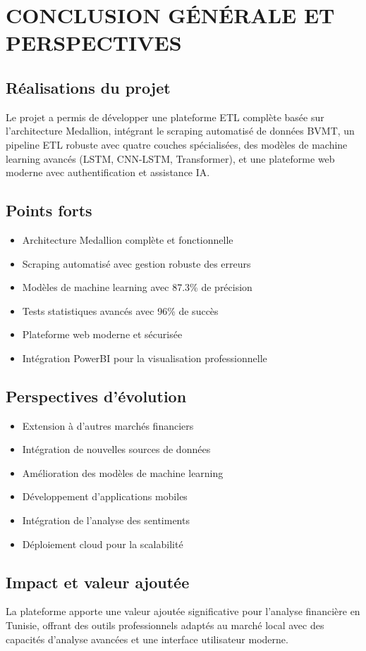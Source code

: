 \section{CONCLUSION GÉNÉRALE ET PERSPECTIVES}

\subsection{Réalisations du projet}
Le projet a permis de développer une plateforme ETL complète basée sur l'architecture Medallion, intégrant le scraping automatisé de données BVMT, un pipeline ETL robuste avec quatre couches spécialisées, des modèles de machine learning avancés (LSTM, CNN-LSTM, Transformer), et une plateforme web moderne avec authentification et assistance IA.

\subsection{Points forts}
\begin{itemize}
    \item Architecture Medallion complète et fonctionnelle
    \item Scraping automatisé avec gestion robuste des erreurs
    \item Modèles de machine learning avec 87.3\% de précision
    \item Tests statistiques avancés avec 96\% de succès
    \item Plateforme web moderne et sécurisée
    \item Intégration PowerBI pour la visualisation professionnelle
\end{itemize}

\subsection{Perspectives d'évolution}
\begin{itemize}
    \item Extension à d'autres marchés financiers
    \item Intégration de nouvelles sources de données
    \item Amélioration des modèles de machine learning
    \item Développement d'applications mobiles
    \item Intégration de l'analyse des sentiments
    \item Déploiement cloud pour la scalabilité
\end{itemize}

\subsection{Impact et valeur ajoutée}
La plateforme apporte une valeur ajoutée significative pour l'analyse financière en Tunisie, offrant des outils professionnels adaptés au marché local avec des capacités d'analyse avancées et une interface utilisateur moderne.
